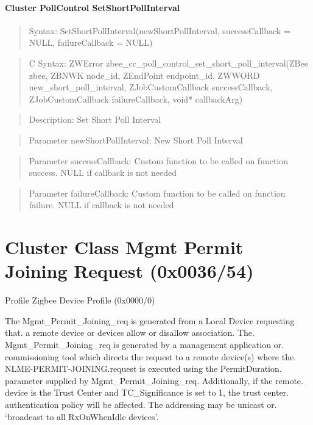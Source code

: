 \paragraph{Cluster PollControl SetShortPollInterval}
\begin{quote}Syntax: SetShortPollInterval(newShortPollInterval, successCallback = NULL, failureCallback = NULL)\end{quote}
\begin{quote}C Syntax: ZWError zbee\_cc\_poll\_control\_set\_short\_poll\_interval(ZBee zbee, ZBNWK node\_id, ZEndPoint endpoint\_id, ZWWORD new\_short\_poll\_interval, ZJobCustomCallback successCallback, ZJobCustomCallback failureCallback, void* callbackArg)\end{quote}
\begin{quote}Description: Set Short Poll Interval\end{quote}
\begin{quote}Parameter newShortPollInterval: New Short Poll Interval\end{quote}
\begin{quote}Parameter successCallback: Custom function to be called on function success. NULL if callback is not needed\end{quote}
\begin{quote}Parameter failureCallback: Custom function to be called on function failure. NULL if callback is not needed\end{quote}



\section{Cluster Class Mgmt Permit Joining Request (0x0036/54)}

Profile Zigbee Device Profile (0x0000/0)

The Mgmt\_Permit\_Joining\_req is generated from a Local Device requesting that. a remote device or devices allow or disallow association. The. Mgmt\_Permit\_Joining\_req is generated by a management application or. commissioning tool which directs the request to a remote device(s) where the. NLME-PERMIT-JOINING.request is executed using the PermitDuration. parameter supplied by Mgmt\_Permit\_Joining\_req. Additionally, if the remote. device is the Trust Center and TC\_Significance is set to 1, the trust center. authentication policy will be affected. The addressing may be unicast or. ‘broadcast to all RxOnWhenIdle devices’.
